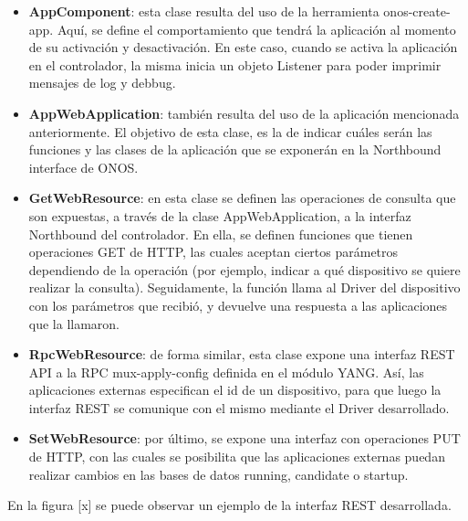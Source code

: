   \begin{itemize}
	\item \textbf{AppComponent}: esta clase resulta del uso de la herramienta onos-create-app. Aquí, se define el comportamiento que tendrá la aplicación al momento de su activación y desactivación. En este caso, cuando se activa la aplicación en el controlador, la misma inicia un objeto Listener para poder imprimir mensajes de log y debbug.
    
    \item \textbf{AppWebApplication}: también resulta del uso de la aplicación mencionada anteriormente. El objetivo de esta clase, es la de indicar cuáles serán las funciones y las clases de la aplicación que se exponerán en la Northbound interface de ONOS.

    \item \textbf{GetWebResource}: en esta clase se definen las operaciones de consulta que son expuestas, a través de la clase AppWebApplication, a la interfaz Northbound del controlador. En ella, se definen funciones que tienen operaciones GET de HTTP, las cuales aceptan ciertos parámetros dependiendo de la operación (por ejemplo, indicar a qué dispositivo se quiere realizar la consulta). Seguidamente, la función llama al Driver del dispositivo con los parámetros que recibió,  y devuelve una respuesta a las aplicaciones que la llamaron.
    
    \item \textbf{RpcWebResource}: de forma similar, esta clase expone una interfaz REST API a la RPC mux-apply-config definida en el módulo YANG. Así, las aplicaciones externas especifican el id de un dispositivo, para que luego la interfaz REST se comunique con el mismo mediante el Driver desarrollado. 
    
    \item \textbf{SetWebResource}: por último, se expone una interfaz con operaciones PUT de HTTP, con las cuales se posibilita que las aplicaciones externas puedan realizar cambios en las bases de datos running, candidate o startup.

\end{itemize}

En la figura [x] se puede observar un ejemplo de la interfaz REST desarrollada. 

